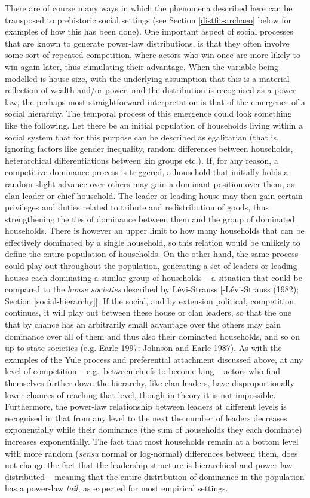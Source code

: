 \documentclass[
  12pt,
]{book}
\begin{document}
There are of course many ways in which the phenomena described here can be transposed to prehistoric social settings (see Section \ref{distfit-archaeo} below for examples of how this has been done). One important aspect of social processes that are known to generate power-law distributions, is that they often involve some sort of repeated competition, where actors who win once are more likely to win again later, thus cumulating their advantage. When the variable being modelled is house size, with the underlying assumption that this is a material reflection of wealth and/or power, and the distribution is recognised as a power law, the perhaps most straightforward interpretation is that of the emergence of a social hierarchy. The temporal process of this emergence could look something like the following. Let there be an initial population of households living within a social system that for this purpose can be described as egalitarian (that is, ignoring factors like gender inequality, random differences between households, heterarchical differentiations between kin groups etc.). If, for any reason, a competitive dominance process is triggered, a household that initially holds a random slight advance over others may gain a dominant position over them, as clan leader or chief household. The leader or leading house may then gain certain privileges and duties related to tribute and redistribution of goods, thus strengthening the ties of dominance between them and the group of dominated households. There is however an upper limit to how many households that can be effectively dominated by a single household, so this relation would be unlikely to define the entire population of households. On the other hand, the same process could play out throughout the population, generating a set of leaders or leading houses each dominating a similar group of households -- a situation that could be compared to the \emph{house societies} described by Lévi-Strauss {[}-Lévi-Strauss (1982); Section \ref{social-hierarchy}{]}. If the social, and by extension political, competition continues, it will play out between these house or clan leaders, so that the one that by chance has an arbitrarily small advantage over the others may gain dominance over all of them and thus also their dominated households, and so on up to state societies (e.g. Earle 1997; Johnson and Earle 1987). As with the examples of the Yule process and preferential attachment discussed above, at any level of competition -- e.g.~between chiefs to become king -- actors who find themselves further down the hierarchy, like clan leaders, have disproportionally lower chances of reaching that level, though in theory it is not impossible. Furthermore, the power-law relationship between leaders at different levels is recognised in that from any level to the next the number of leaders decreases exponentially while their dominance (the sum of households they each dominate) increases exponentially. The fact that most households remain at a bottom level with more random (\emph{sensu} normal or log-normal) differences between them, does not change the fact that the leadership structure is hierarchical and power-law distributed -- meaning that the entire distribution of dominance in the population has a power-law \emph{tail}, as expected for most empirical settings.
\end{document}

